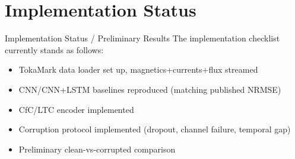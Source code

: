 \documentclass[aspectratio=169]{beamer}
\begin{document}
\section{Implementation Status}
\begin{frame}{Implementation Status / Preliminary Results}
  The implementation checklist currently stands as follows:
  \vspace{4pt}
  \begin{itemize}
    \item[$\square$] TokaMark data loader set up, magnetics+currents+flux streamed
    \item[$\square$] CNN/CNN+LSTM baselines reproduced (matching published NRMSE)
    \item[$\square$] CfC/LTC encoder implemented
    \item[$\square$] Corruption protocol implemented (dropout, channel failure, temporal gap)
    \item[$\square$] Preliminary clean-vs-corrupted comparison
  \end{itemize}
  \vspace{8pt}
  \begin{center}
  \end{center}
\end{frame}

\end{document}
